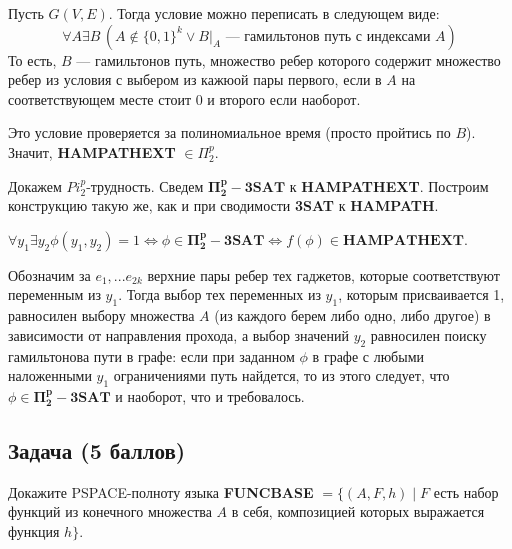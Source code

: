\begin{solution}
    Пусть $G (V, E)$. Тогда условие можно переписать в следующем виде:
    $$\forall A \exists B \, (A \notin \{0, 1\}^k \vee B|_A \text{ --- гамильтонов путь с индексами } A)$$
    То есть, $B$ --- гамильтонов путь, множество ребер которого содержит множество ребер из условия
    с выбером из кажюой пары первого, если в $A$ на соответствующем месте стоит 0 и второго если наоборот.

    Это условие проверяется за полиномиальное время (просто пройтись по $B$).
    Значит, \textbf{HAMPATHEXT} $\in \Pi_2^p$.

    Докажем $Pi_2^p$-трудность. Сведем $\mathbf{\Pi_2^p-3SAT}$ к \textbf{HAMPATHEXT}.
    Построим конструкцию такую же, как и при сводимости \textbf{3SAT} к \textbf{HAMPATH}.

    $\forall y_1 \exists y_2 \phi(y_1, y_2) = 1 \Leftrightarrow \phi \in \mathbf{\Pi_2^p-3SAT} \Leftrightarrow f(\phi) \in \mathbf{HAMPATHEXT}$.

    Обозначим за $e_1, ... e_{2k}$ верхние пары ребер тех гаджетов, которые соответствуют переменным из $y_1$.
    Тогда выбор тех переменных из $y_1$, которым присваивается 1, равносилен выбору множества $A$ (из каждого берем либо одно, либо другое) в зависимости от направления прохода,
    а выбор значений $y_2$ равносилен поиску гамильтонова пути в графе: если при заданном $\phi$ в графе с любыми наложенными $y_1$ ограничениями путь найдется, то из
    этого следует, что $\phi \in \mathbf{\Pi_2^p-3SAT}$ и наоборот, что и требовалось.
\end{solution}


\subsection{Задача \textbf{(5 баллов)}}

Докажите PSPACE-полноту языка \textbf{FUNCBASE} $= \{(A, F, h) \mid F$ есть набор функций из конечного множества $A$ в себя,
композицией которых выражается функция $h\}$.

